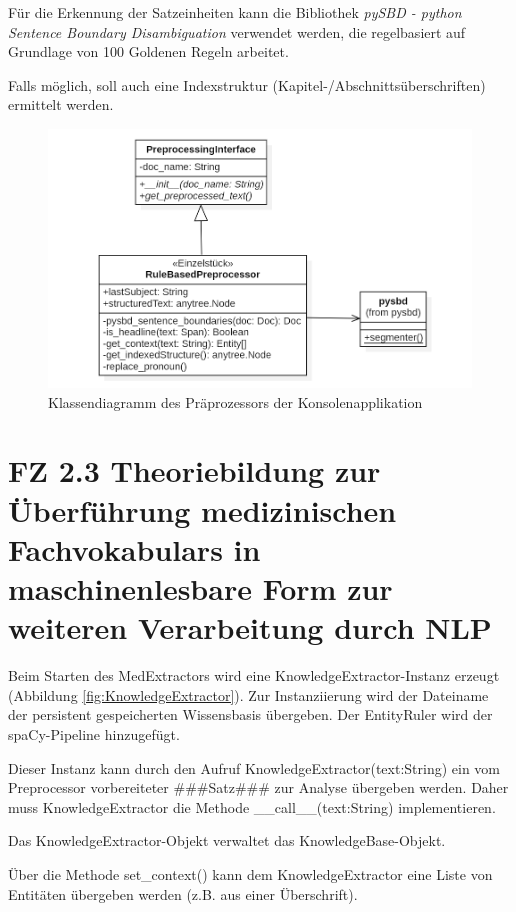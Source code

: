 Für die Erkennung der Satzeinheiten kann die Bibliothek \emph{pySBD - python Sentence Boundary Disambiguation} verwendet werden, die regelbasiert auf Grundlage von 100 \glqq Goldenen Regeln\grqq{} arbeitet.

Falls möglich, soll auch eine Indexstruktur (Kapitel-/Abschnittsüberschriften) ermittelt werden.

\begin{figure}[h]
    \centering
    \includegraphics[width=\textwidth]{pictures/RuleBasedPreprocessor.png}
    \caption{Klassendiagramm des Präprozessors der Konsolenapplikation}
    \label{fig:preprocessor}
\end{figure}

\section{FZ 2.3 Theoriebildung zur Überführung medizinischen Fachvokabulars in maschinenlesbare Form zur weiteren Verarbeitung durch NLP}
\label{sec:FZ2.3} 

Beim Starten des MedExtractors wird eine KnowledgeExtractor-Instanz erzeugt (Abbildung \ref{fig:KnowledgeExtractor}). Zur Instanziierung wird der Dateiname der persistent gespeicherten Wissensbasis übergeben. Der EntityRuler wird der spaCy-Pipeline hinzugefügt.

Dieser Instanz kann durch den Aufruf KnowledgeExtractor(text:String) ein vom Preprocessor vorbereiteter \#\#\#Satz\#\#\# zur Analyse übergeben werden. Daher muss KnowledgeExtractor die Methode \_\_call\_\_(text:String) implementieren.

Das KnowledgeExtractor-Objekt verwaltet das KnowledgeBase-Objekt.

Über die Methode set\_context() kann dem KnowledgeExtractor eine Liste von Entitäten übergeben werden (z.B. aus einer Überschrift).

